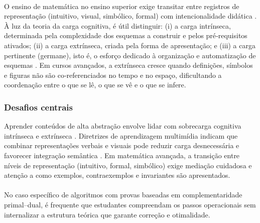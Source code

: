 \documentclass[12pt,a4paper]{article}
\def\emph#1{#1}%
\begin{document}
\paragraph{}
O ensino de matemática no ensino superior exige transitar entre registros de representação (intuitivo, visual, simbólico, formal) com intencionalidade didática \cite{tall1991advanced}. À luz da teoria da carga cognitiva, é útil distinguir: (i) a \emph{carga intrínseca}, determinada pela complexidade dos esquemas a construir e pelos pré‑requisitos ativados; (ii) a \emph{carga extrínseca}, criada pela forma de apresentação; e (iii) a \emph{carga pertinente} (\emph{germane}), isto é, o esforço dedicado à organização e automatização de esquemas \cite{sweller1988cognitive}. Em cursos avançados, a extrínseca cresce quando definições, símbolos e figuras não são co‑referenciados no tempo e no espaço, dificultando a coordenação entre o que se lê, o que se vê e o que se infere.

\subsubsection{Desafios centrais}
Aprender conteúdos de alta abstração envolve lidar com sobrecarga cognitiva intrínseca e extrínseca \cite{sweller1988cognitive}. Diretrizes de aprendizagem multimídia indicam que combinar representações verbais e visuais pode reduzir carga desnecessária e favorecer integração semântica \cite{mayer2009multimedia,paivio1990}. Em matemática avançada, a transição entre níveis de representação (intuitivo, formal, simbólico) exige mediação cuidadosa \cite{tall1991advanced} e atenção a como exemplos, contraexemplos e invariantes são apresentados.

\paragraph{}
No caso específico de algoritmos com provas baseadas em complementaridade primal--dual, é frequente que estudantes compreendam os passos operacionais sem internalizar a estrutura teórica que garante correção e otimalidade.
\end{document}
